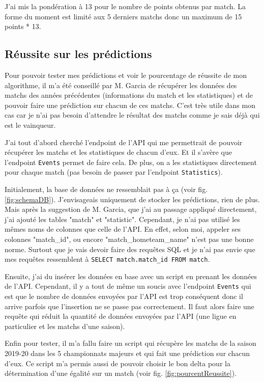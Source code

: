 \documentclass[a4paper,14pt]{extarticle}
\begin{document}
{J'ai mis la pondération à 13 pour le nombre de points obtenus par match. La forme du moment est limité aux 5 derniers matchs donc un maximum de 15 points * 13.

\subsection{Réussite sur les prédictions}
\label{test_pourcent_reussite}

Pour pouvoir tester mes prédictions et voir le pourcentage de réussite de mon algorithme, il m'a été conseillé par M. Garcia de récupérer les données des matchs des années précédentes (informations du match et les statistiques) et de pouvoir faire une prédiction sur chacun de ces matchs. C'est très utile dans mon cas car je n'ai pas besoin d'attendre le résultat des matchs comme je sais déjà qui est le vainqueur.

J'ai tout d'abord cherché l'endpoint de l'API qui me permettrait de pouvoir récupérer les matchs et les statistiques de chacun d'eux. Et il s'avère que l'endpoint \texttt{Events} permet de faire cela. De plus, on a les statistiques directement pour chaque match (pas besoin de passer par l'endpoint \texttt{Statistics}). 

Initialement, la base de données ne ressemblait pas à ça (voir fig. \ref{fig:schemaDB}). J'envisageais uniquement de stocker les prédictions, rien de plus. Mais après la suggestion de M. Garcia, que j'ai au passage appliqué directement, j'ai ajouté les tables "match" et "statistic". Cependant, je n'ai pas utilisé les mêmes noms de colonnes que celle de l'API. En effet, selon moi, appeler ses colonnes "match\_id", ou encore "match\_hometeam\_name" n'est pas une bonne norme. Surtout que je vais devoir faire des requêtes SQL et je n'ai pas envie que mes requêtes ressemblent à \texttt{SELECT match.match\_id FROM match}.

Ensuite, j'ai du insérer les données en base avec un script en prenant les données de l'API. Cependant, il y a tout de même un soucis avec l'endpoint \texttt{Events} qui est que le nombre de données envoyées par l'API est trop conséquent donc il arrive parfois que l'insertion ne se passe pas correctement. Il faut alors faire une requête qui réduit la quantité de données envoyées par l'API (une ligue en particulier et les matchs d'une saison). 

Enfin pour tester, il m'a fallu faire un script qui récupère les matchs de la saison 2019-20 dans les 5 championnats majeurs et qui fait une prédiction sur chacun d'eux. Ce script m'a permis aussi de pouvoir choisir le bon delta pour la détermination d'une égalité sur un match (voir fig. \ref{fig:pourcentReussite}). 

}
\end{document}
